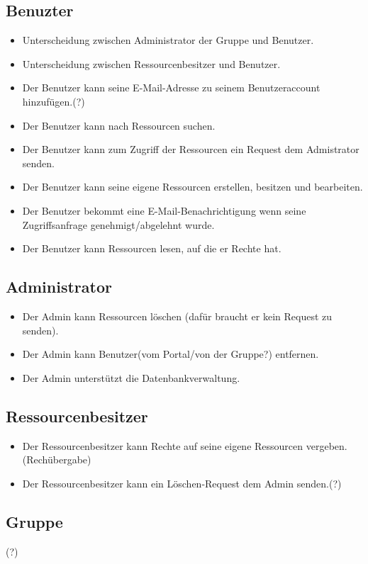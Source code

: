 \documentclass[parskip=full,11pt]{scrartcl}
\begin{document}
\subsection*{Benuzter}
\begin{itemize}[itemsep=0pt]
\item Unterscheidung zwischen \gls{Administrator} der Gruppe und Benutzer.
\item Unterscheidung zwischen \gls{Ressourcenbesitzer} und Benutzer.
 
\item Der Benutzer kann seine E-Mail-Adresse zu seinem Benutzeraccount hinzufügen.(?)
\item Der Benutzer kann nach Ressourcen suchen.
\item Der Benutzer kann zum Zugriff der Ressourcen ein Request dem Admistrator senden.
\item Der Benutzer kann seine eigene Ressourcen erstellen, besitzen und bearbeiten.
\item Der Benutzer bekommt eine E-Mail-Benachrichtigung wenn seine Zugriffsanfrage genehmigt/abgelehnt wurde.
\item Der Benutzer kann Ressourcen lesen, auf die er Rechte hat.
\end{itemize}
\subsection*{Administrator}
\begin{itemize}[itemsep=0pt]
\item Der Admin kann Ressourcen löschen (dafür braucht er kein Request zu senden).
\item Der Admin kann Benutzer(vom Portal/von der Gruppe?) entfernen.
\item Der Admin unterstützt die Datenbankverwaltung.
\end{itemize}
 
\subsection*{Ressourcenbesitzer}
\begin{itemize}[itemsep=0pt]
\item Der Ressourcenbesitzer kann Rechte auf seine eigene Ressourcen vergeben.(Rechübergabe)
\item Der Ressourcenbesitzer kann ein \gls{Löschen-Request} dem Admin senden.(?)
\end{itemize}

\subsection*{Gruppe}(?)
\begin{itemize}[itemsep=0pt]
\end{itemize}
\end{document}

